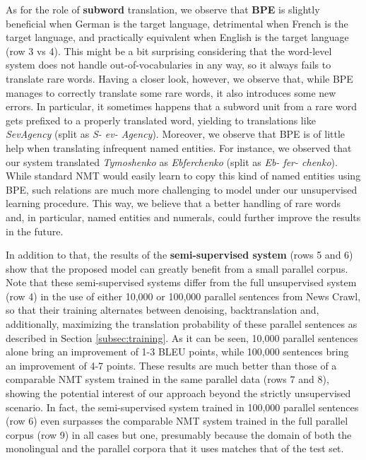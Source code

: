 \documentclass{article} \usepackage{iclr2018_conference,times}
\begin{document}
As for the role of {\bf subword} translation, we observe that \textbf{BPE} is slightly beneficial when German is the target language, detrimental when French is the target language, and practically equivalent when English is the target language (row 3 vs 4). This might be a bit surprising considering that the word-level system does not handle out-of-vocabularies in any way, so it always fails to translate rare words. Having a closer look, however, we observe that, while BPE manages to correctly translate some rare words, it also introduces some new errors. In particular, it sometimes happens that a subword unit from a rare word gets prefixed to a properly translated word, yielding to translations like \textit{SevAgency} (split as \textit{S- ev- Agency}). Moreover, we observe that BPE is of little help when translating infrequent named entities. For instance, we observed that our system translated \textit{Tymoshenko} as \textit{Ebferchenko} (split as \textit{Eb- fer- chenko}). While standard NMT would easily learn to copy this kind of named entities using BPE, such relations are much more challenging to model under our unsupervised learning procedure. This way, we believe that a better handling of rare words and, in particular, named entities and numerals, could further improve the results in the future.

In addition to that, the results of the \textbf{semi-supervised system} (rows 5 and 6) show that the proposed model can greatly benefit from a small parallel corpus. Note that these semi-supervised systems differ from the full unsupervised system (row 4) in the use of either 10,000 or 100,000 parallel sentences from News Crawl, so that their training alternates between denoising, backtranslation and, additionally, maximizing the translation probability of these parallel sentences as described in Section \ref{subsec:training}. As it can be seen, 10,000 parallel sentences alone bring an improvement of 1-3 BLEU points, while 100,000 sentences bring an improvement of 4-7 points. These results are much better than those of a comparable NMT system trained in the same parallel data (rows 7 and 8), showing the potential interest of our approach beyond the strictly unsupervised scenario. In fact, the semi-supervised system trained in 100,000 parallel sentences (row 6) even surpasses the comparable NMT system trained in the full parallel corpus (row 9) in all cases but one, presumably because the domain of both the monolingual and the parallel corpora that it uses matches that of the test set.
\end{document}
